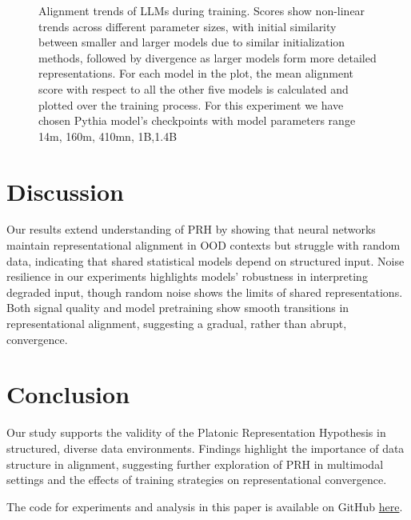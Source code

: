 \documentclass[10pt,a4paper]{article}
\begin{document}
\begin{figure}[H]
    \caption{Alignment trends of LLMs during training. Scores show non-linear trends across different parameter sizes, with initial similarity between smaller and larger models due to similar initialization methods, followed by divergence as larger models form more detailed representations. For each model in the plot, the mean alignment score with respect to all the other five models is calculated and plotted over the training process. For this experiment we have chosen Pythia model's \cite{biderman2023pythia} checkpoints with model parameters range  14m, 160m, 410mn, 1B,1.4B }
    \label{fig:llm_training_alignment}
\end{figure}

\section{Discussion}
Our results extend understanding of PRH by showing that neural networks maintain representational alignment in OOD contexts but struggle with random data, indicating that shared statistical models depend on structured input. Noise resilience in our experiments highlights models' robustness in interpreting degraded input, though random noise shows the limits of shared representations. Both signal quality and model pretraining show smooth transitions in representational alignment, suggesting a gradual, rather than abrupt, convergence.

\section{Conclusion}
Our study supports the validity of the Platonic Representation Hypothesis in structured, diverse data environments. Findings highlight the importance of data structure in alignment, suggesting further exploration of PRH in multimodal settings and the effects of training strategies on representational convergence.

\vfill
The code for experiments and analysis in this paper is available on GitHub \href{https://github.com/rokosbasilisk/prh-experiments}{here}.
\end{document}
